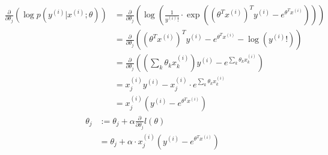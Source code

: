 \begin{answer}
\begin{align*}
\frac{\partial}{\partial\theta_{j}}\left(\log p(y^{(i)} | x^{(i)}; \theta)\right)&=\frac{\partial}{\partial\theta_{j}}\left(\log\left(\frac{1}{y^{(i)}!}\cdot\exp\left((\theta^{T}x^{(i)})^{T}y^{(i)}-e^{\theta^{T}x^{(i)}}\right)\right)\right)\\
&=\frac{\partial}{\partial\theta_{j}}\left((\theta^{T}x^{(i)})^{T}y^{(i)}-e^{\theta^{T}x^{(i)}}-\log(y^{(i)}!)\right)\\
&=\frac{\partial}{\partial\theta_{j}}\left(\left(\sum_{k}\theta_{k}x_{k}^{(i)}\right)y^{(i)}-e^{\sum_{k}\theta_{k}x_{k}^{(i)}}\right)\\
&=x_{j}^{(i)}y^{(i)}-x_{j}^{(i)}\cdot e^{\sum_{k}\theta_{k}x_{k}^{(i)}}\\
&=x_{j}^{(i)}(y^{(i)}-e^{\theta^{T}x^{(i)}}) 
\end{align*}
\begin{align*}
\theta_{j}&:=\theta_{j}+\alpha\frac{\partial}{\partial\theta_{j}}l(\theta)\\
&=\theta_{j}+\alpha\cdot x_{j}^{(i)}(y^{(i)}-e^{\theta^{T}x^{(i)}}) 
\end{align*}
\end{answer}
